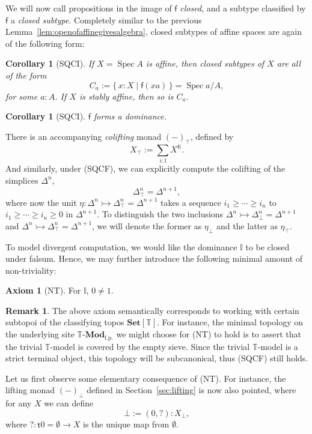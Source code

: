 \documentclass[12pt]{amsart}
\newtheorem{corollary}[theorem]{Corollary}
\theoremstyle{definition}
\newtheorem{remark}[theorem]{Remark}
\newtheorem*{axiom}{Axiom}
\newcommand{\mb}[1]{\mathbf{#1}}
\newcommand{\mbb}[1]{\mathbb{#1}}
\newcommand{\T}{\mbb T}
\newcommand{\I}{\mbb I}
\newcommand{\mr}[1]{\mathrm{#1}}
\newcommand{\ms}[1]{\mathsf{#1}}
\newcommand{\Set}{\mb{Set}}
\newcommand{\scomp}[2]{\{\,#1\mid#2\,\}}
\newcommand{\inj}{\rightarrowtail}
\newcommand{\fp}{_{\mr{f.p.}}}
\newcommand{\prt}{_{\bot}}
\newcommand{\cprt}{_{\top}}
\newcommand{\emp}{\emptyset}
\newcommand{\mmod}[1]{#1\text{-}\mathbf{Mod}}
\newcommand{\spec}{\operatorname{Spec}}
\begin{document}
We will now call propositions in the image of $\ms f$ \emph{closed}, and a subtype classified by $\ms f$ a \emph{closed subtype}. Completely similar to the previous Lemma~\ref{lem:openofaffinegivesalgebra}, closed subtypes of affine spaces are again of the following form:

\begin{corollary}[SQCI]\label{cor:closedaffinealgebra}
  If $X = \spec A$ is affine, then closed subtypes of $X$ are all of the form
  \[ C_a := \scomp{x : X}{\ms f(xa)} = \spec a/A, \]
  for some $a:A$. If $X$ is stably affine, then so is $C_a$.
\end{corollary}

\begin{corollary}[SQCI]
  $\ms f$ forms a dominance.
\end{corollary}

There is an accompanying \emph{colifting} monad $(-)\cprt$, defined by
\[ X\cprt := \sum_{i:\I} X^{\ms fi}. \]
And similarly, under (SQCF), we can explicitly compute the colifting of the simplices $\Delta^n$,
\[ \Delta^n\cprt = \Delta^{n+1}, \]
where now the unit $\eta : \Delta^n \inj \Delta^n\cprt = \Delta^{n+1}$ takes a sequence $i_1 \ge \cdots \ge i_n$ to $i_1 \ge \cdots \ge i_n \ge 0$ in $\Delta^{n+1}$. To distinguish the two inclusions $\Delta^n \inj \Delta^n\prt = \Delta^{n+1}$ and $\Delta^n \inj \Delta^{n}\cprt = \Delta^{n+1}$, we will denote the former as $\eta\prt$ and the latter as $\eta\cprt$.

To model divergent computation, we would like the dominance $\I$ to be closed under falsum. Hence, we may further introduce the following minimal amount of non-triviality:

\begin{axiom}[NT]\label{ax:nt}
  For $\I$, $0 \neq 1$.
\end{axiom}

\begin{remark}
  The above axiom semantically corresponds to working with certain subtopoi of the classifying topos $\Set[\T]$. For instance, the minimal topology on the underlying site $\mmod\T\fp$ we might choose for (NT) to hold is to assert that the trivial $\T$-model is covered by the empty sieve. Since the trivial $\T$-model is a strict terminal object, this topology will be subcanonical, thus (SQCF) still holds.
\end{remark}

Let us first observe some elementary consequence of (NT). For instance, the lifting monad $(-)\prt$ defined in Section~\ref{sec:lifting} is now also pointed, where for any $X$ we can define
\[ \bot := (0,?) : X\prt, \]
where $? : \ms t0 = \emp \to X$ is the unique map from $\emp$.
\end{document}

